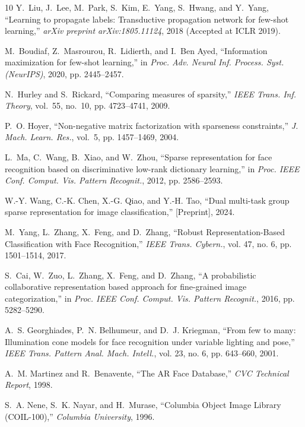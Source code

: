 \documentclass[10pt,comsoc]{IEEEtran}
\begin{document}
\begin{thebibliography}{10}
Y.~Liu, J.~Lee, M.~Park, S.~Kim, E.~Yang, S.~Hwang, and Y.~Yang, ``Learning to propagate labels: Transductive propagation network for few-shot learning,'' \emph{arXiv preprint arXiv:1805.11124}, 2018 (Accepted at ICLR 2019).

M.~Boudiaf, Z.~Masrourou, R.~Lidierth, and I.~Ben Ayed, ``Information maximization for few-shot learning,'' in \emph{Proc. Adv. Neural Inf. Process. Syst. (NeurIPS)}, 2020, pp. 2445--2457.

N.~Hurley and S.~Rickard, ``Comparing measures of sparsity,'' \emph{IEEE Trans. Inf. Theory}, vol.~55, no.~10, pp. 4723--4741, 2009.

P.~O. Hoyer, ``Non-negative matrix factorization with sparseness constraints,'' \emph{J. Mach. Learn. Res.}, vol.~5, pp. 1457--1469, 2004.

L.~Ma, C.~Wang, B.~Xiao, and W.~Zhou, ``Sparse representation for face recognition based on discriminative low-rank dictionary learning,'' in \emph{Proc. IEEE Conf. Comput. Vis. Pattern Recognit.}, 2012, pp. 2586--2593.

 W.-Y. Wang, C.-K. Chen, X.-G. Qiao, and Y.-H. Tao, ``Dual multi-task group sparse representation for image classification,'' [Preprint], 2024.

M.~Yang, L.~Zhang, X.~Feng, and D.~Zhang, ``Robust Representation-Based Classification with Face Recognition,'' \emph{IEEE Trans. Cybern.}, vol. 47, no. 6, pp. 1501--1514, 2017.

S.~Cai, W.~Zuo, L.~Zhang, X.~Feng, and D.~Zhang, ``A probabilistic collaborative representation based approach for fine-grained image categorization,'' in \emph{Proc. IEEE Conf. Comput. Vis. Pattern Recognit.}, 2016, pp. 5282--5290.

A.~S. Georghiades, P.~N. Belhumeur, and D.~J. Kriegman, ``From few to many: Illumination cone models for face recognition under variable lighting and pose,'' \emph{IEEE Trans. Pattern Anal. Mach. Intell.}, vol. 23, no. 6, pp. 643--660, 2001.

A.~M. Martinez and R.~Benavente, ``The AR Face Database,'' \emph{CVC Technical Report}, 1998.

S.~A. Nene, S.~K. Nayar, and H.~Murase, ``Columbia Object Image Library (COIL-100),'' \emph{Columbia University}, 1996.


\end{thebibliography}
\end{document}
